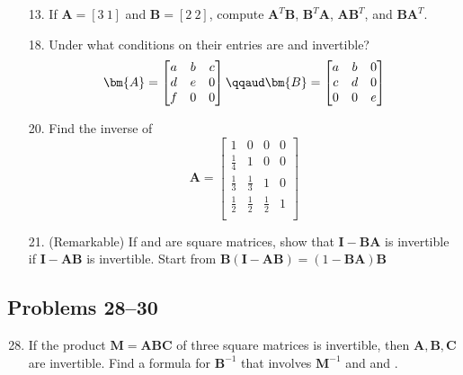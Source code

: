 \begin{itemize}
\begin{itemize}
      \item[13.] If \(\bm{A} = [3~1]\) and \(\bm{B} = [2~2]\), compute
        \(\bm{A}^T \bm{B}\), \(\bm{B}^T \bm{A}\), \(\bm{AB}^T\), and \(\bm{BA}^T\).

      \item[18.] Under what conditions on their entries are  and 
        invertible?
        \[%
        \bm{A} =
        \begin{bmatrix}
        a & b & c \\
        d & e & 0 \\
        f & 0 & 0
        \end{bmatrix} \qqaud
        \bm{B} =
        \begin{bmatrix}
        a & b & 0 \\
        c & d & 0 \\
        0 & 0 & e
        \end{bmatrix}
        \]%

      \item[20.] Find the inverse of
        \[%
        \bm{A} =
        \begin{bmatrix}
          1 & 0 & 0 & 0 \\
          \frac{1}{4} & 1 & 0 & 0 \\
          \frac{1}{3} & \frac{1}{3} & 1 & 0 \\
          \frac{1}{2} & \frac{1}{2} & \frac{1}{2} & 1 \\
        \end{bmatrix}
        \]%

      \item[21.] (Remarkable) If  and  are square matrices, show
        that \(\bm{I}-\bm{BA}\) is invertible if \(\bm{I}-\bm{AB}\) is
        invertible. Start from \( \bm{B}(\bm{I} - \bm{AB}) = (1 -
        \bm{BA})\bm{B}\)

    \end{itemize}

    \subsection{Problems 28--30}
    \begin{enumerate}\setcounter{enumi}{27}\color{foreground-2}
      \item If the product \(\bm{M} = \bm{ABC}\) of three square matrices is invertible, then
        \(\bm{A}, \bm{B}, \bm{C}\) are invertible. Find a formula for \(
        \bm{B}^{-1} \) that involves \( \bm{M}^{-1} \) and  and .


\end{enumerate}
\end{itemize}
